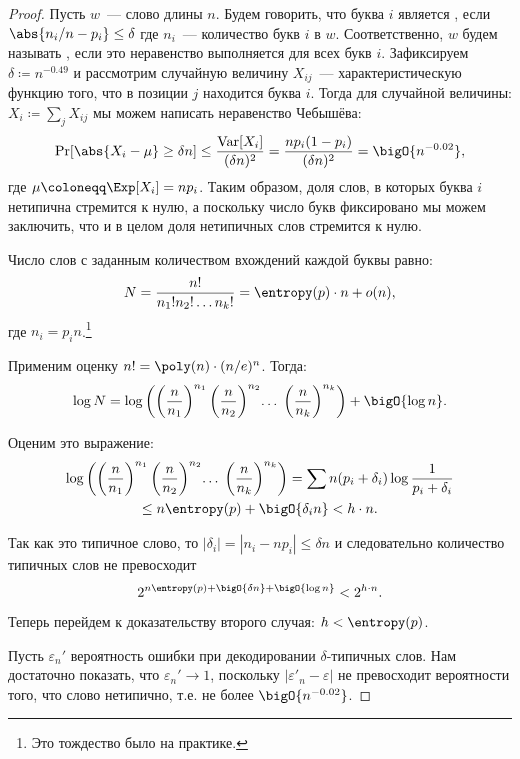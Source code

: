 \begin{proof}
    Пусть $w$~--- слово длины $n$. Будем говорить, что буква $i$ является ,
    если $\abs{n_i / n - p_i} \le \delta$ где $n_i$~--- количество букв $i$ в $w$. Соответственно, $w$
    будем называть , если это неравенство выполняется для всех букв
    $i$. Зафиксируем $\delta \coloneqq n^{-0.49}$ и рассмотрим случайную величину $X_{ij}$~---
    характеристическую функцию того, что в позиции $j$ находится буква $i$. Тогда для случайной величины:
    $X_i \coloneqq \sum_j X_{ij}$ мы можем написать неравенство Чебышёва:
    $$
        \Pr[\abs{X_i - \mu} \ge \delta n] \le \frac{\operatorname{Var}[X_i]}{(\delta n)^2} =
        \frac{n p_i (1 - p_i)}{(\delta n)^2} = \bigO{n^{-0.02}},
    $$
    где $\mu \coloneqq \Exp[X_i] = np_i$. Таким образом, доля слов, в которых буква $i$ нетипична
    стремится к нулю, а поскольку число букв фиксировано мы можем заключить, что и в целом доля
    нетипичных слов стремится к нулю. 
    
    Число слов с заданным количеством вхождений каждой буквы равно:
    $$
        N = \frac{n!}{n_1!n_2!\dots n_k!} = \entropy(p) \cdot n + o(n),
    $$
    где $n_i = p_in$.\footnote{Это тождество было на практике.}
    
    Применим оценку $n! = \poly(n) \cdot (n / e)^n$. Тогда:
    $$
        \log{N} =
        \log\left(\left(\frac{n}{n_1}\right)^{n_1} \left(\frac{n}{n_2}\right)^{n_2} \!\ldots\;
          \left(\frac{n}{n_k}\right)^{n_k} \right)
        + \bigO{\log n}.
    $$

    Оценим это выражение:
    \begin{multline*}
        \log\left(\left(\frac{n}{n_1}\right)^{n_1} \left(\frac{n}{n_2}\right)^{n_2}
          \!\ldots\;\left(\frac{n}{n_k}\right)^{n_k} \right)
        = \sum n(p_i + \delta_i) \log\frac{1}{p_i + \delta_i}\\
        \le n \entropy(p) + \bigO{\delta_i n} < h \cdot n.
    \end{multline*}
    
    Так как это типичное слово, то $|\delta_i| = |n_i - np_i| \le \delta n$ и следовательно количество
    типичных слов не превосходит
    $$
        2^{n \entropy(p) + \bigO{\delta n} + \bigO{\log n}} < 2^{h \cdot n}.
    $$

    Теперь перейдем к доказательству второго случая: $h < \entropy(p)$.
    
    Пусть $\varepsilon_n'$ вероятность ошибки при декодировании $\delta$-типичных слов. Нам достаточно
    показать, что $\varepsilon_n' \to 1$, поскольку $|\varepsilon'_n - \varepsilon|$ не 
    превосходит вероятности того, что слово нетипично, т.е. не более $\bigO{n^{-0.02}}$.
    

\end{proof}
